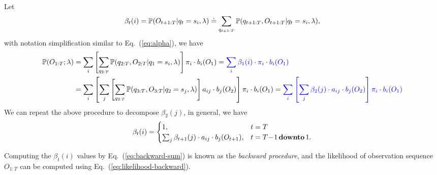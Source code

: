 Let 
\begin{equation}
\label{eq:beta}
\beta_t(i) = \mathbb{P}(O_{t+1:T} |q_t = s_i, \lambda) \doteq \sum_{q_{t+1:T}} \mathbb{P}(q_{t+1:T}, O_{t+1:T} |q_t = s_i, \lambda),
\end{equation}
with notation simplification similar to Eq.~(\ref{eq:alpha}), we have
\begin{alignat}{2}
\mathbb{P}(O_{1:T} ;\lambda) 
&= \sum_{i} \left[ \sum_{q_{2:T}} \mathbb{P}(q_{2:T}, O_{2:T} |q_1 = s_i, \lambda) \right] \pi_i \cdot b_i(O_1) 
 = {\color{blue}{\sum_{i} \beta_1(i) \cdot \pi_i \cdot b_i(O_1)}}  \label{eq:likelihood-backward} \\
&= \sum_{i} \left[ \sum_{j} \left[ \sum_{q_{3:T}} \mathbb{P}(q_{3:T}, O_{3:T} |q_2 = s_j, \lambda) \right] a_{ij} \cdot b_j(O_2) \right] \pi_i \cdot b_i(O_1) 
 = {\color{blue}{\sum_{i} \left[ \sum_{j} \beta_2(j) \cdot a_{ij} \cdot b_j(O_2) \right] \pi_i \cdot b_i(O_1)}}  \nonumber
\end{alignat}
We can repeat the above procedure to decompose $\beta_2(j)$, in general, we have
\begin{equation}
\label{eq:backward-sum}
\beta_t(i) = \begin{cases}
              1, & t=T \\
              \sum_{j} \beta_{t+1}(j) \cdot a_{ij} \cdot b_j(O_{t+1}), & t=T\!-\!1 \,\textbf{downto}\, 1.
             \end{cases}
\end{equation}

Computing the $\beta_t(i)$ values by Eq.~(\ref{eq:backward-sum}) is known as the \emph{backward procedure}, 
and the likelihood of observation sequence $O_{1:T}$ can be computed using Eq.~(\ref{eq:likelihood-backward}).

